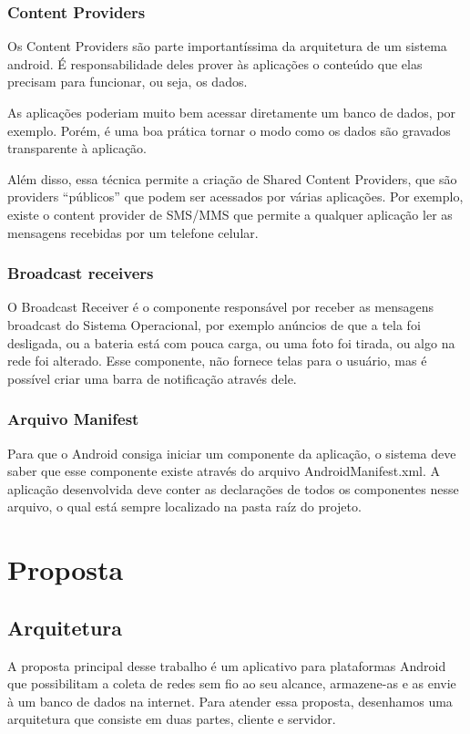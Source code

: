 \documentclass[12pt, %
openright, 
oneside,
a4paper,
brazil]{facom-ufu-abntex2}
\begin{document}
	\subsection{Content Providers}
	Os Content Providers são parte importantíssima da arquitetura de um sistema android. É responsabilidade deles prover às aplicações o conteúdo que elas precisam para funcionar, ou seja, os dados.

As aplicações poderiam muito bem acessar diretamente um banco de dados, por exemplo. Porém, é uma boa prática tornar o modo como os dados são gravados transparente à aplicação. 

Além disso, essa técnica permite a criação de Shared Content Providers, que são providers “públicos” que podem ser acessados por várias aplicações. Por exemplo, existe o content provider de SMS/MMS que permite a qualquer aplicação ler as mensagens recebidas por um telefone celular.

	\subsection{Broadcast receivers}
	O Broadcast Receiver é o componente responsável por receber as mensagens broadcast do Sistema Operacional, por exemplo anúncios de que a tela foi desligada, ou a bateria está com pouca carga, ou uma foto foi tirada, ou algo na rede foi alterado. Esse componente, não fornece telas para o usuário, mas é possível criar uma barra de notificação através dele.

	\subsection{Arquivo Manifest}
	Para que o Android consiga iniciar um componente da aplicação, o sistema deve saber que esse componente existe através do arquivo AndroidManifest.xml. A aplicação desenvolvida deve conter as declarações de todos os componentes nesse arquivo, o qual está sempre localizado na pasta raíz do projeto.		


\chapter{Proposta}


\section{Arquitetura}
A proposta principal desse trabalho é um aplicativo para plataformas Android que possibilitam a coleta de redes sem fio ao seu alcance, armazene-as e as envie à um banco de dados na internet. Para atender essa proposta, desenhamos uma arquitetura que consiste em duas partes, cliente e servidor.
\end{document}
